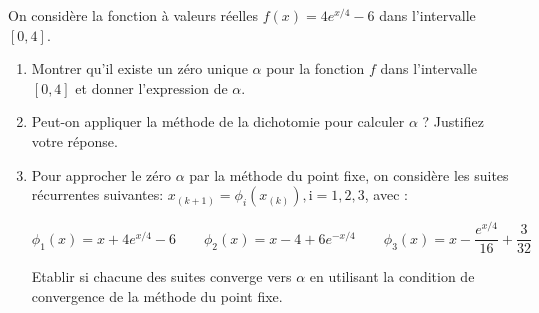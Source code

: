 
On considère la fonction à valeurs réelles $f(x)=4 e^{x / 4}-6$ dans l'intervalle $[0,4]$.
\begin{enumerate}
\item Montrer qu'il existe un zéro unique $\alpha$ pour la fonction $f$ dans l'intervalle $[0,4]$ et donner l'expression de $\alpha$.
\item Peut-on appliquer la méthode de la dichotomie pour calculer $\alpha$ ? Justifiez votre réponse.
\item Pour approcher le zéro $\alpha$ par la méthode du point fixe, on considère les suites récurrentes suivantes: $x_{(k+1)}=\phi_i\left(x_{(k)}\right), \mathrm{i}=1,2,3$, avec :

$$
\phi_1(x)=x+4 e^{x / 4}-6 \qquad \phi_2(x)=x-4+6 e^{-x / 4} \qquad \phi_3(x)=x-\frac{e^{x / 4}}{16}+\frac{3}{32}
$$


Etablir si chacune des suites converge vers $\alpha$ en utilisant la condition de convergence de la méthode du point fixe.
\end{enumerate}